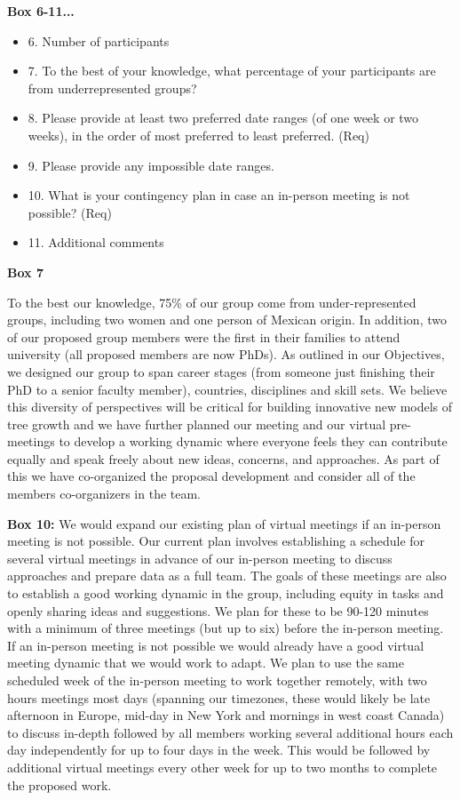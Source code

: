 \documentclass[11pt]{article}
\begin{document}
{\bf Box 6-11...} 
\begin{itemize}
\item 6. Number of participants
\item 7. To the best of your knowledge, what percentage of your participants are from underrepresented groups?
\item 8. Please provide at least two preferred date ranges (of one week or two weeks), in the order of most preferred to least preferred. (Req) %
\item 9. Please provide any impossible date ranges. %
\item 10. What is your contingency plan in case an in-person meeting is not possible? (Req)
\item 11. Additional comments
\end{itemize}


{\bf Box 7} 

To the best our knowledge, 75\% of our group come from under-represented groups, including two women and one person of Mexican origin. In addition, two of our proposed group members were the first in their families to attend university (all proposed members are now PhDs). As outlined in our Objectives, we designed our group to span career stages (from someone just finishing their PhD to a senior faculty member), countries, disciplines and skill sets. We believe this diversity of perspectives will be critical for building innovative new models of tree growth and we have further planned our meeting and our virtual pre-meetings to develop a working dynamic where everyone feels they can contribute equally and speak freely about new ideas, concerns, and approaches. As part of this we have co-organized the proposal development and consider all of the members co-organizers in the team. 

{\bf Box 10:}  We would expand our existing plan of virtual meetings if an in-person meeting is not possible. Our current plan involves establishing a schedule for several virtual meetings in advance of our in-person meeting to discuss approaches and prepare data as a full team. The goals of these meetings are also to establish a good working dynamic in the group, including equity in tasks and openly sharing ideas and suggestions. We plan for these to be 90-120 minutes with a minimum of three meetings (but up to six) before the in-person meeting. If an in-person meeting is not possible we would already have a good virtual meeting dynamic that we would work to adapt. We plan to use the same scheduled week of the in-person meeting to work together remotely, with two hours meetings most days (spanning our timezones, these would likely be late afternoon in Europe, mid-day in New York and mornings in west coast Canada) to discuss in-depth followed by all members working several additional hours each day independently for up to four days in the week. This would be followed by additional virtual meetings every other week for up to two months to complete the proposed work. 
\end{document}
